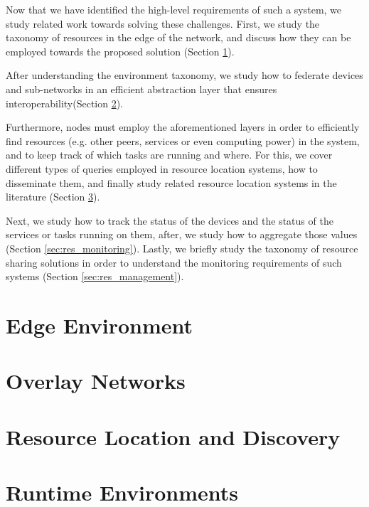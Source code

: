 Now that we have identified the high-level requirements of such a system, we study related work towards solving these challenges. First, we study the taxonomy of resources in the edge of the network, and discuss how they can be employed towards the proposed solution (Section \ref{sec:edge_computing}).

After understanding the environment taxonomy, we study how to federate devices and sub-networks in an efficient abstraction layer that ensures interoperability(Section \ref{sec:overlay_networks}).

Furthermore, nodes must employ the aforementioned layers in order to efficiently find resources (e.g. other peers, services or even computing power) in the system, and to keep track of which tasks are running and where. For this, we cover different types of queries employed in resource location systems, how to disseminate them, and finally study related resource location systems in the  literature (Section \ref{sec:res_location}).

Next, we study how to track the status of the devices and the status of the services or tasks running on them, after, we study how to aggregate those values (Section \ref{sec:res_monitoring}).  Lastly, we briefly study the taxonomy of resource sharing solutions in order to understand the monitoring requirements of such systems (Section \ref{sec:res_management}). 

\section{Edge Environment} \label{sec:edge_computing} 

\section{Overlay Networks} \label{sec:overlay_networks} 

\section{Resource Location and Discovery} \label{sec:res_location} 

\section{Runtime Environments} \label{sec:runtime_environments} 

